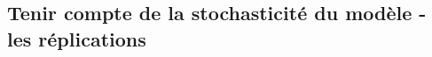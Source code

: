
\subsection{Tenir compte de la stochasticité du modèle - les réplications}\label{subsec:capter-replications}


